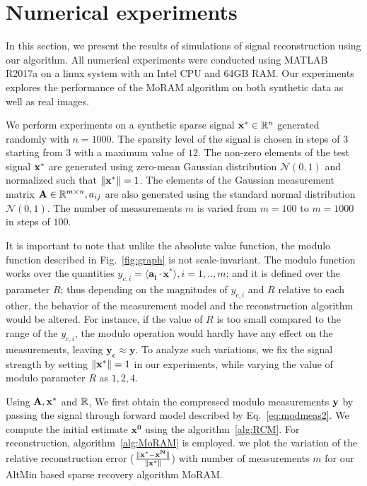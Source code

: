 \section{Numerical experiments}
\label{sec:exp}
In this section, we present the results of simulations of signal reconstruction using our algorithm. All numerical experiments were conducted using MATLAB R2017a on a linux system with an Intel CPU and 64GB RAM. Our experiments explores the performance of the MoRAM algorithm on both synthetic data as well as real images.

We perform experiments on a synthetic sparse signal $\mathbf{x^*} \in {\mathbb{R}}^n$ generated randomly with $n=1000$. The sparsity level of the signal is chosen in steps of $3$ starting from $3$ with a maximum value of $12$. The non-zero elements of the test signal $\mathbf{x^*}$ are generated using zero-mean Gaussian distribution $\mathcal{N}(0, 1)$ and normalized such that $\|\mathbf{x^*}\| =1$. The elements of the Gaussian measurement matrix $\mathbf{A} \in {\mathbb{R}}^{m\times n}, a_{ij}$ are also generated using the standard normal distribution $\mathcal{N}(0, 1)$. The number of measurements $m$ is varied from $m = 100$ to $m=1000$ in steps of $100$.  

It is important to note that unlike the absolute value function, the modulo function described in Fig.~\ref{fig:graph} is not scale-invariant. The modulo function works over the quantities $y_{c,i}=\langle \mathbf{a_i} \cdot \mathbf{x^*} \rangle, i=1,..,m$; and it is defined over the parameter $R$; thus depending on the magnitudes of $y_{c,i}$ and $R$ relative to each other, the behavior of the measurement model and the reconstruction algorithm would be altered. For instance, if the value of $R$ is too small compared to the range of the $y_{c,i}$, the modulo operation would hardly have any effect on the measurements, leaving $\mathbf{y_c \approx y}$. To analyze such variations, we fix the signal strength by setting $\|\mathbf{x^*}\| =1$ in our experiments, while varying the value of modulo parameter $R$ as ${1,2,4}$.

Using $\mathbf{A, x^*}$ and ${\mathbb{R}}$, We first obtain the compressed modulo measurements $\mathbf{y}$ by passing the signal through forward model described by Eq.~\ref{eq:modmeas2}. We compute the initial estimate $\mathbf{x^0}$ using the algorithm~\ref{alg:RCM}. For reconstruction, algorithm~\ref{alg:MoRAM} is employed. we plot the variation of the relative reconstruction error ($\frac{\|\mathbf{x^*-x^N}\|}{\|\mathbf{x^*}\|}$) with number of measurements $m$ for our AltMin based sparse recovery algorithm MoRAM.

